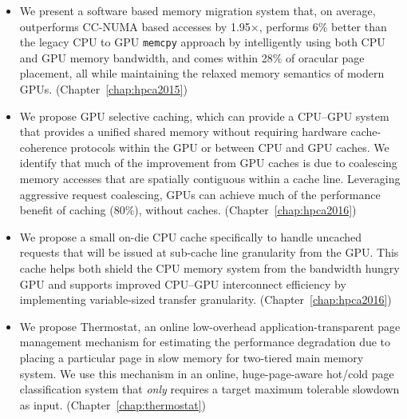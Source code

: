 \begin{itemize}

\item 
We present a software based memory migration system that, on average,
outperforms CC-NUMA based accesses by 1.95$\times$, performs 6\% better than the
legacy CPU to GPU {\tt memcpy} approach by intelligently using both CPU and GPU
memory bandwidth, and comes within 28\% of oracular page placement, all while
maintaining the relaxed memory semantics of modern GPUs.
(Chapter~\ref{chap:hpca2015})

\item
We propose GPU selective caching, which can provide a CPU--GPU system that
provides a unified shared memory without requiring hardware cache-coherence
protocols within the GPU or between CPU and GPU caches.
We identify that much of the improvement from GPU caches is due to coalescing 
memory accesses that are spatially contiguous within a cache line.  Leveraging
aggressive request coalescing, GPUs can achieve much of the performance benefit
of caching (80\%), without caches. (Chapter~\ref{chap:hpca2016})

\item
We propose a small on-die CPU cache specifically to handle uncached requests
that will be issued at sub-cache line granularity from the GPU. This cache helps
both shield the CPU memory system from the bandwidth hungry GPU and supports
improved CPU--GPU interconnect efficiency by implementing variable-sized
transfer granularity. (Chapter~\ref{chap:hpca2016})

%
\item
We propose Thermostat, an online low-overhead application-transparent page
management mechanism for estimating the performance degradation due to placing a
particular page in slow memory for two-tiered main memory system.  We use this
mechanism in an online, huge-page-aware hot/cold page classification system that
{\it only} requires a target maximum tolerable slowdown as input.
(Chapter~\ref{chap:thermostat})


\end{itemize}
